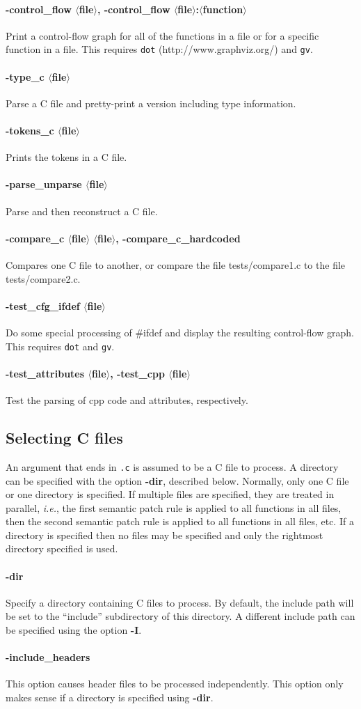 \documentclass{article}
\newcommand{\minimum}[2]{\paragraph*{\makebox[0in][r]{\FilledBigDiamondshape\,\,} {{#1}}} {#2}}
\newcommand{\normal}[2]{\paragraph*{\makebox[0in][r]{\BigLowerDiamond\,\,} {{#1}}} {#2}}
\newcommand{\rare}[2]{\paragraph*{\makebox[0in][r]{\BigDiamondshape\,\,} {{#1}}} {#2}}
\newcommand{\developer}[2]{\paragraph*{{#1}} {#2}}
\begin{document}
\normal{-control\_flow $\langle$file$\rangle$, -control\_flow
$\langle$file$\rangle$:$\langle$function$\rangle$}{ Print a control-flow
graph for all of the functions in a file or for a specific function in a
file.  This requires {\tt dot} (http://www.graphviz.org/) and {\tt gv}.}

\rare{-type\_c $\langle$file$\rangle$}{ Parse a C file and pretty-print a
version including type information.}

\developer{-tokens\_c $\langle$file$\rangle$}{Prints the tokens in a C
  file.}

\developer{-parse\_unparse $\langle$file$\rangle$}{Parse and then reconstruct
  a C file.}

\developer{-compare\_c $\langle$file$\rangle$ $\langle$file$\rangle$,
  -compare\_c\_hardcoded}{Compares one C file to another, or compare the
file tests/compare1.c to the file tests/compare2.c.}

\developer{-test\_cfg\_ifdef $\langle$file$\rangle$}{Do some special
processing of \#ifdef and display the resulting control-flow graph.  This
requires {\tt dot} and {\tt gv}.}

\developer{-test\_attributes $\langle$file$\rangle$,
           -test\_cpp $\langle$file$\rangle$}{
Test the parsing of cpp code and attributes, respectively.}

\subsection{Selecting C files}

An argument that ends in {\tt .c} is assumed to be a C file to process.  A
directory can be specified with the option {\bf -dir}, described below.
Normally, only one C file or one directory is specified.  If multiple files
are specified, they are treated in parallel, {\em i.e.}, the first semantic
patch rule is applied to all functions in all files, then the second
semantic patch rule is applied to all functions in all files, etc.  If a
directory is specified then no files may be specified and only the
rightmost directory specified is used.

\minimum{-dir}{ Specify a directory containing C files to process.  By
  default, the include path will be set to the ``include'' subdirectory of
  this directory.  A different include path can be specified using the
  option {\bf -I}.}

\normal{-include\_headers}{ This option causes header files to be processed
independently.  This option only makes sense if a directory is specified
using {\bf -dir}.}
\end{document}

